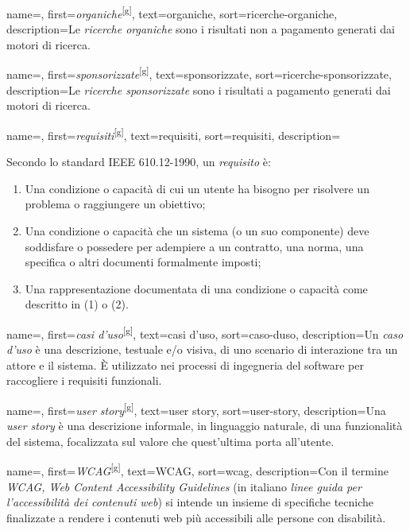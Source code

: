  {
    name=,
    first={\textit{organiche}\textsuperscript{[g]}},
    text=organiche,
    sort=ricerche-organiche,
    description={Le \textit{ricerche organiche} sono i risultati non a pagamento generati dai motori di ricerca.}
}

 {
    name=,
    first={\textit{sponsorizzate}\textsuperscript{[g]}},
    text=sponsorizzate,
    sort=ricerche-sponsorizzate,
    description={Le \textit{ricerche sponsorizzate} sono i risultati a pagamento generati dai motori di ricerca.}
}

 {
    name=,
    first={\textit{requisiti}\textsuperscript{[g]}},
    text=requisiti,
    sort=requisiti,
    description={Secondo lo standard IEEE 610.12-1990, un \textit{requisito} è:
    \begin{enumerate}
        \item Una condizione o capacità di cui un utente ha bisogno per risolvere un problema o raggiungere un obiettivo;
        \item Una condizione o capacità che un sistema (o un suo componente) deve soddisfare o possedere per adempiere a un contratto, una norma, una specifica o altri documenti formalmente imposti;
        \item Una rappresentazione documentata di una condizione o capacità come descritto in (1) o (2).
    \end{enumerate}
    }
}

 {
    name=,
    first={\textit{casi d'uso}\textsuperscript{[g]}},
    text=casi d'uso,
    sort=caso-duso,
    description={Un \textit{caso d'uso} è una descrizione, testuale e/o visiva, di uno scenario di interazione tra un attore e il sistema. È utilizzato nei processi di ingegneria del software per raccogliere i \gls{requisiti} funzionali.}
}

 {
    name=,
    first={\textit{user story}\textsuperscript{[g]}},
    text=user story,
    sort=user-story,
    description={Una \textit{user story} è una descrizione informale, in linguaggio naturale, di una funzionalità del sistema, focalizzata sul valore che quest'ultima porta all'utente.}
}

 {
    name=,
    first={\textit{WCAG}\textsuperscript{[g]}},
    text=WCAG,
    sort=wcag,
    description={Con il termine \textit{WCAG, Web Content Accessibility Guidelines} (in italiano \textit{linee guida per l'accessibilità dei contenuti web}) si intende un insieme di specifiche tecniche finalizzate a rendere i contenuti web più accessibili alle persone con disabilità.}
}

